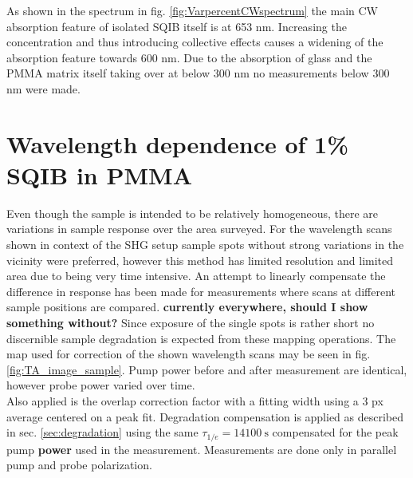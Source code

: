 \documentclass[twoside,openright]{scrreprt}
\begin{document}
As shown in the spectrum in fig. \ref{fig:VarpercentCWspectrum} the main CW absorption feature of isolated SQIB itself is at 653 nm. Increasing the concentration and thus introducing collective effects causes a widening of the absorption feature towards 600 nm. Due to the absorption of glass and the PMMA matrix itself taking over at below 300 nm no measurements below 300 nm were made.\\

\section{Wavelength dependence of 1\% SQIB in PMMA}


Even though the sample is intended to be relatively homogeneous, there are variations in sample response over the area surveyed. For the wavelength scans shown in context of the SHG setup sample spots without strong variations in the vicinity were preferred, however this method has limited resolution and limited area due to being very time intensive. An attempt to linearly compensate the difference in response has been made for measurements where scans at different sample positions are compared. \textbf{currently everywhere, should I show something without?} Since exposure of the single spots is rather short no discernible sample degradation is expected from these mapping operations. The map used for correction of the shown wavelength scans may be seen in fig. \ref{fig:TA_image_sample}. Pump power before and after measurement are identical, however probe power varied over time.\\
Also applied is the overlap correction factor with a fitting width using a 3 px average centered on a peak fit. Degradation compensation is applied as described in sec. \ref{sec:degradation} using the same $\tau_{1/e} = \SI{14100}{\second}$ compensated for the peak pump \textbf{power} used in the measurement.
Measurements are done only in parallel pump and probe polarization.
\end{document}
